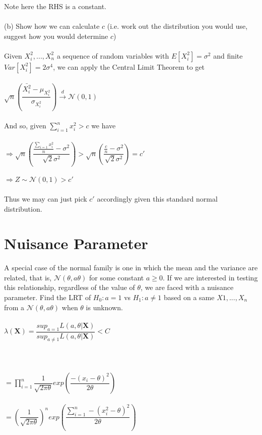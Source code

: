 \documentclass{article}
\begin{document}
Note here the RHS is a constant.\\\\
(b) Show how we can calculate $c$ (i.e. work out the distribution you would use, suggest how you would determine $c$)\\\\
Given $X_i^2,...,X_n^2$ a sequence of random variables with $E[X_i^2]=\sigma^2$ and finite $Var[X_i^2]=2\sigma^4$, we can apply the Central Limit Theorem to get\\\\
$\sqrt{n}(\dfrac{\bar{X_i^2}-\mu_{X_i^2}}{\sigma_{X_i^2}})\xrightarrow{d}\mathcal{N}(0,1)$\\\\
And so, given $\sum_{i=1}^nx_i^2>c$ we have \\\\
$\Rightarrow \sqrt{n}(\dfrac{\frac{\sum_{i=1}x_i^2}{n}-\sigma^2}{\sqrt{2}\sigma^2})>\sqrt{n}(\dfrac{\frac{c}{n}-\sigma^2}{\sqrt{2}\sigma^2})=c'$\\\\
$\Rightarrow Z\sim\mathcal{N}(0,1)>c'$\\\\
Thus we may can just pick $c'$ accordingly given this standard normal distribution. 
\section{Nuisance Parameter}
A special case of the normal family is one in which the mean and the variance are related, that is, $\mathcal{N}(\theta,a\theta)$ for some constant $a\geq0$.  If we are interested in testing this relationship, regardless of the value of $\theta$, we are faced with a nuisance parameter.  Find the LRT of $H_0:a=1$ vs $H_1:a\neq1$ based on a same $X1,...,X_n$ from a $\mathcal{N}(\theta,a\theta)$ when $\theta$ is unknown.\\\\
$\lambda(\textbf{X})=\dfrac{sup_{a=1}L(a,\theta|\textbf{X})}{sup_{a\neq1}L(a,\theta|\textbf{X})}<C$\\\\
\pagebreak\\\\
$=\prod_{i=1}^n\dfrac{1}{\sqrt{2\pi\theta}}exp(\dfrac{-(x_i-\theta)^2}{2\theta})$\\\\
$=(\dfrac{1}{\sqrt{2\pi\theta}})^nexp(\dfrac{\sum_{i=1}^n-(x_i^2-\theta)^2}{2\theta})$\\\\
\end{document}
